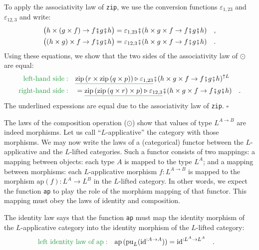 To apply the associativity law of \lstinline!zip!, we use the conversion
functions $\varepsilon_{1,23}$ and $\varepsilon_{12,3}$ and write:
\begin{align*}
 & \big(h\times(g\times f)\rightarrow f\bef g\bef h\big)=\varepsilon_{1,23}\bef(h\times g\times f\rightarrow f\bef g\bef h)\quad,\\
 & \big((h\times g)\times f\rightarrow f\bef g\bef h\big)=\varepsilon_{12,3}\bef(h\times g\times f\rightarrow f\bef g\bef h)\quad.
\end{align*}
Using these equations, we show that the two sides of the associativity
law of $\odot$ are equal:
\begin{align*}
{\color{greenunder}\text{left-hand side}:}\quad & \gunderline{\text{zip}\left(r\times\text{zip}\left(q\times p\right)\right)\triangleright\varepsilon_{1,23}}\bef(h\times g\times f\rightarrow f\bef g\bef h)^{\uparrow L}\\
{\color{greenunder}\text{right-hand side}:}\quad & =\gunderline{\text{zip}\left(\text{zip}\left(q\times r\right)\times p\right)\triangleright\varepsilon_{12,3}}\bef(h\times g\times f\rightarrow f\bef g\bef h)\quad.
\end{align*}
The underlined expessions are equal due to the associativity law of
\lstinline!zip!. $\square$

The laws of the composition operation ($\odot$) show that values
of type $L^{A\rightarrow B}$ are indeed morphisms. Let us call \textsf{``}$L$-applicative\textsf{''}
the category with those morphisms. We may now write the laws of a
(categorical) functor between the $L$-applicative and the $L$-lifted
categories. Such a functor consists of two mappings: a mapping between
objects: each type $A$ is mapped to the type $L^{A}$; and a mapping
between morphisms: each $L$-applicative morphism $f:L^{A\rightarrow B}$
is mapped to the morphism $\text{ap}\left(f\right):L^{A}\rightarrow L^{B}$
in the $L$-lifted category. In other words, we expect the function
\lstinline!ap! to play the role of the morphism mapping of that functor.
This mapping must obey the laws of identity and composition.

The identity law says that the function \lstinline!ap! must map the
identity morphism of the $L$-applicative category into the identity
morphism of the $L$-lifted category:
\begin{align}
{\color{greenunder}\text{left identity law of }\text{ap}:}\quad & \text{ap}\,(\text{pu}_{L}(\text{id}^{:A\rightarrow A}))=\text{id}^{:L^{A}\rightarrow L^{A}}\quad.\label{eq:identity-law-of-ap}
\end{align}

